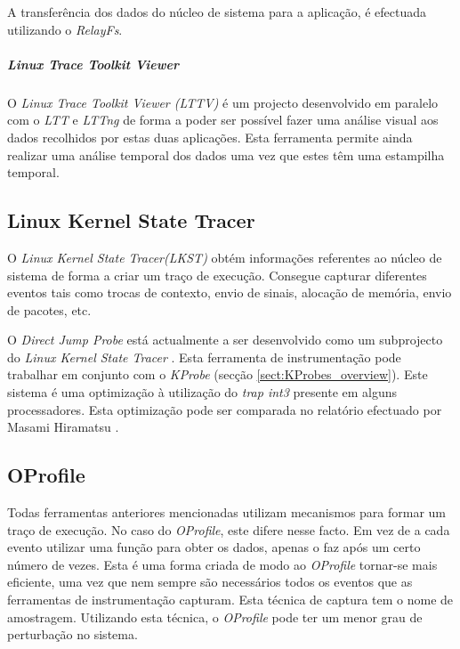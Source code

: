 A transferência dos dados do núcleo de sistema para a aplicação, é efectuada utilizando o \textit{RelayFs}.


\subparagraph{Linux Trace Toolkit Viewer}\label{cap:lttv_overview}
O \textit{Linux Trace Toolkit Viewer (LTTV)} é um projecto desenvolvido em paralelo com o \textit{LTT} e \textit{LTTng} de forma a  poder ser possível fazer uma análise visual aos dados recolhidos por estas duas aplicações.
Esta ferramenta permite ainda realizar uma análise temporal dos dados uma vez que estes têm uma estampilha temporal.


\subsection{Linux Kernel State Tracer}

O \textit{Linux Kernel State Tracer(LKST)} obtém informações referentes ao núcleo de sistema de forma a criar um traço de execução.
Consegue capturar diferentes eventos tais como trocas de contexto, envio de sinais, alocação de memória, envio de pacotes, etc.

\label{cap:djprobe}
O \textit{Direct Jump Probe} está actualmente a ser desenvolvido como um subprojecto do \textit{Linux Kernel State Tracer} . 
Esta ferramenta de instrumentação pode trabalhar em conjunto com o \textit{KProbe} (secção \ref{sect:KProbes_overview}). 
Este sistema é uma optimização à utilização do \textit{trap int3} presente em alguns processadores. Esta optimização pode ser comparada no relatório efectuado por Masami Hiramatsu \cite{Hiramatsu2005}.
 
\subsection{OProfile}\label{cap:Oprofile_overview}
Todas ferramentas anteriores mencionadas utilizam mecanismos para formar um traço de execução.
No caso do \textit{OProfile}, este difere nesse facto. Em vez de a cada evento utilizar uma função para obter os dados, apenas o faz após um certo número de vezes.
Esta é uma forma criada de modo ao \textit{OProfile} tornar-se mais eficiente, uma vez que nem sempre são necessários todos os eventos que as ferramentas de instrumentação capturam.
Esta técnica de captura tem o nome de amostragem.
Utilizando esta técnica, o \textit{OProfile} pode ter um menor grau de perturbação no sistema\cite{Will:TuninProgrOProf}.

